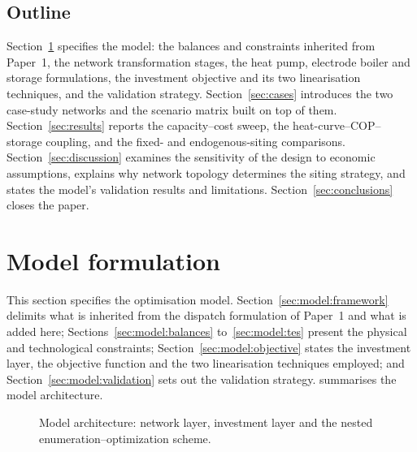 \documentclass[review,3p]{elsarticle}
\begin{document}
\subsection{Outline}
\label{sec:intro:outline}

Section~\ref{sec:model} specifies the model: the balances and
constraints inherited from Paper~1, the network transformation stages,
the heat pump, electrode boiler and storage formulations, the investment
objective and its two linearisation techniques, and the validation
strategy. Section~\ref{sec:cases} introduces the two case-study networks
and the scenario matrix built on top of them.
Section~\ref{sec:results} reports the capacity--cost sweep, the
heat-curve--COP--storage coupling, and the fixed- and endogenous-siting
comparisons. Section~\ref{sec:discussion} examines the sensitivity of
the design to economic assumptions, explains why network topology
determines the siting strategy, and states the model's validation
results and limitations. Section~\ref{sec:conclusions} closes the paper.

\section{Model formulation}
\label{sec:model}
This section specifies the optimisation model. Section~\ref{sec:model:framework}
delimits what is inherited from the dispatch formulation of Paper~1
\cite{Ruess.2026} and what is added here; Sections~\ref{sec:model:balances}
to~\ref{sec:model:tes} present the physical and technological
constraints; Section~\ref{sec:model:objective} states the investment
layer, the objective function and the two linearisation techniques
employed; and Section~\ref{sec:model:validation} sets out the validation
strategy.  summarises the model architecture.

\begin{figure}[htbp]
  \centering
  \caption{Model architecture: network layer, investment layer and the
  nested enumeration--optimization scheme.}
  \label{fig:F1}
\end{figure}
\end{document}
